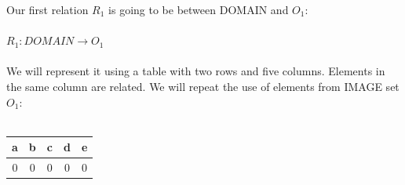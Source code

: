 		\noindent
		Our first relation $R_{1}$ is going to be between DOMAIN and $O_{1}$:\\\\
		$R_{1}: DOMAIN \rightarrow O_{1}$\\\\
		We will represent it using a table with two rows and five columns. Elements in the same column are related. We will repeat the use of elements from IMAGE set $O_{1}$:\\\\
		
		\begin{table}[h!]
			\begin{center}
				\begin{tabular}{|c|c|c|c|c|}
					\hline
					a & b & c & d & e \\
					\hline
					0 & 0 & 0 & 0 & 0 \\
					\hline
				\end{tabular}
			\end{center}
		\end{table}
		
